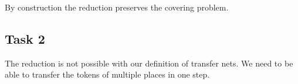 By construction the reduction preserves the covering problem.

\subsection{Task 2}
The reduction is not possible with our definition of transfer nets. We need to be able to transfer the tokens of multiple places in one step.